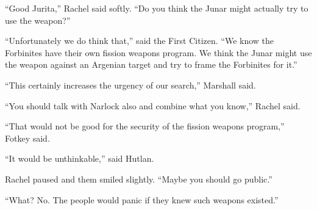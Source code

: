 ``Good Jurita,'' Rachel said softly. ``Do you think the Junar might actually try to use the
weapon?''

``Unfortunately we do think that,'' said the First Citizen. ``We know the Forbinites have their
own fission weapons program. We think the Junar might use the weapon against an Argenian target
and try to frame the Forbinites for it.''

``This certainly increases the urgency of our search,'' Marshall said.

``You should talk with Narlock also and combine what you know,'' Rachel said.

``That would not be good for the security of the fission weapons program,'' Fotkey said.

``It would be unthinkable,'' said Hutlan.

Rachel paused and them smiled slightly. ``Maybe you should go public.''

``What? No. The people would panic if they knew such weapons existed.''
